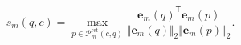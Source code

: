 \[
s_m(q,c)=\max_{p\in\mathcal{P}^{\mathrm{ret}}_m(c,q)}\frac{\mathbf{e}_m(q)^{\mathsf{T}}\mathbf{e}_m(p)}{\Vert\mathbf{e}_m(q)\Vert_2\Vert\mathbf{e}_m(p)\Vert_2}.
\]
